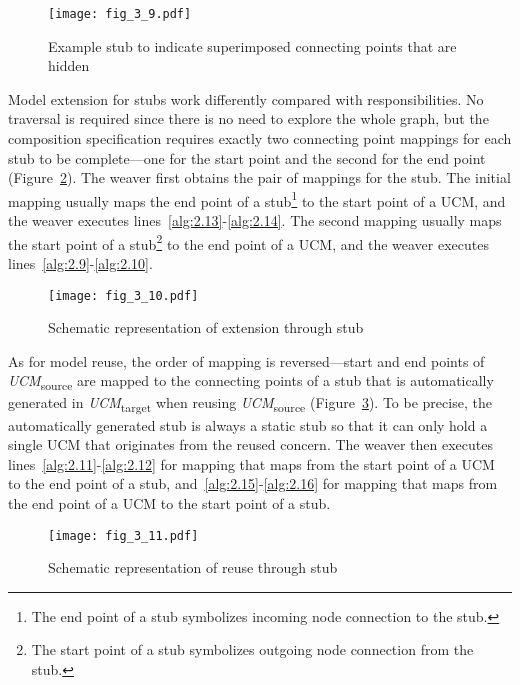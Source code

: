 \begin{figure}[h]
	\centering
	\texttt{[image: fig\_3\_9.pdf]}
	\caption{Example stub to indicate superimposed connecting points that are hidden}
	\label{fig:3.9}
\end{figure}

Model extension for stubs work differently compared with responsibilities. No traversal is required since there is no need to explore the whole graph, but the composition specification requires exactly two connecting point mappings for each stub to be complete---one for the start point and the second for the end point (Figure~\ref{fig:3.10}). The weaver first obtains the pair of mappings for the stub. The initial mapping usually maps the end point of a stub\footnote{The end point of a stub symbolizes incoming node connection to the stub.} to the start point of a UCM, and the weaver executes lines~\ref{alg:2.13}-\ref{alg:2.14}. The second mapping usually maps the start point of a stub\footnote{The start point of a stub symbolizes outgoing node connection from the stub.} to the end point of a UCM, and the weaver executes lines~\ref{alg:2.9}-\ref{alg:2.10}.

\begin{figure}[h]
	\centering
	\texttt{[image: fig\_3\_10.pdf]}
	\caption{Schematic representation of extension through stub}
	\label{fig:3.10}
\end{figure}

As for model reuse, the order of mapping is reversed---start and end points of \emph{UCM}\textsubscript{source} are mapped to the connecting points of a stub that is automatically generated in \emph{UCM}\textsubscript{target} when reusing \emph{UCM}\textsubscript{source} (Figure~\ref{fig:3.11}). To be precise, the automatically generated stub is always a static stub so that it can only hold a single UCM that originates from the reused concern. The weaver then executes lines~\ref{alg:2.11}-\ref{alg:2.12} for mapping that maps from the start point of a UCM to the end point of a stub, and~\ref{alg:2.15}-\ref{alg:2.16} for mapping that maps from the end point of a UCM to the start point of a stub.

\begin{figure}[h]
	\centering
	\texttt{[image: fig\_3\_11.pdf]}
	\caption{Schematic representation of reuse through stub}
	\label{fig:3.11}
\end{figure}


